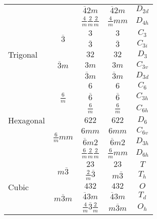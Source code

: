 \begin{table}[h]
\begin{tabular}{lcccc}
                               &                                 & $\overline{4}2m$ & $\overline{4}2m$ & $D_{2d}$ \\ 
                               &                                 & $\displaystyle \frac{4}{m}\frac{2}{m}\frac{2}{m}$ & $\displaystyle \frac{4}{m}mm$ & $D_{4h}$ \\ [1.5ex]
    \hline
    \multirow{5}{*}{Trigonal } & \multirow{2}{*}{$\overline{3}$} & $3$ & $3$ & $C_3$\\
                               &                                 & $\overline{3}$ & $\overline{3}$ & $C_{3i}$ \\
                               \cline{2-5}
							  & \multirow{3}{*}{$\overline{3}m$} & $32$ & $32$ & $D_3$\\
                               &                                 & $3m$ & $3m$ & $C_{3v}$ \\
                               &                                 & $\overline{3}m$ & $\overline{3}m$ & $D_{3d}$ \\ 
    \hline
    \multirow{7}{*}{Hexagonal} & \multirow{3}{*}{$\displaystyle \frac{6}{m}$} & $6$ & $6$ & $C_6$\\
                               &                                 & $\overline{6}$ & $\overline{6}$ & $C_{3h}$ \\
                               &                                 & $\displaystyle \frac{6}{m}$ & $\displaystyle \frac{6}{m}$ & $C_{6h}$ \\[1.5ex]
                               \cline{2-5}
							  & \multirow{4}{*}{$\displaystyle \frac{6}{m}mm$} & $622$ & $622$ & $D_6$\\
                               &                                 & $6mm$ & $6mm$ & $C_{6v}$ \\
                               &                                 & $\overline{6}m2$ & $\overline{6}m2$ & $D_{3h}$ \\ 
                               &                                 & $\displaystyle \frac{6}{m}\frac{2}{m}\frac{2}{m}$ & $\displaystyle \frac{6}{m}mm$ & $D_{6h}$ \\  [1.5ex]
    \hline
    \multirow{5}{*}{Cubic}    & \multirow{2}{*}{$m\overline{3}$} & $23$ & $23$ & $T$\\
                               &                                 & $\displaystyle \frac{2}{m}\overline{3}$ & $m\overline{3}$ & $T_h$ \\
                               \cline{2-5}
							  & \multirow{3}{*}{$m\overline{3}m$} & $432$ & $432$ & $O$\\
                               &                                 & $\overline{4}3m$ & $\overline{4}3m$ & $T_d$ \\
                               &                                 & $\displaystyle \frac{4}{m}\overline{3}\frac{2}{m}$ & $m\overline{3}m$ & $O_h$ \\ [1.5ex]
    \hline  
  \end{tabular}
\end{table}


%
